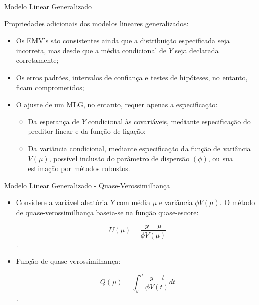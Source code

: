 \documentclass[10pt, aspectratio=169]{beamer}
\begin{document}
\begin{frame}{Modelo Linear Generalizado} 

Propriedades adicionais dos modelos lineares generalizados:

\begin{itemize}

\item Os EMV's são consistentes ainda que a distribuição especificada seja incorreta, mas desde que a média condicional de $Y$ seja declarada corretamente;

\item Os erros padrões, intervalos de confiança e testes de hipóteses, no entanto, ficam comprometidos;

\item O ajuste de um MLG, no entanto, requer apenas a especificação:

\begin{itemize}
\item Da esperança de $Y$ condicional às covariáveis, mediante especificação do preditor linear e da função de ligação;

\item Da variância condicional, mediante especificação da função de variância $V(\mu)$, possível inclusão do parâmetro de dispersão $(\phi)$, ou sua estimação por métodos robustos.

\end{itemize}

\end{itemize}

\end{frame}









\begin{frame}{Modelo Linear Generalizado - Quase-Verossimilhança} 

\begin{itemize}

\item Considere a variável aleatória $Y$ com média $\mu$ e variância $\phi V(\mu)$. O método de quase-verossimilhança baseia-se na função quase-escore:

$$ U(\mu) = \frac{y-\mu}{\phi V(\mu)}$$.

\item Função de quase-verossimilhança:

$$ Q\left ( \mu \right )=\int _y^\mu \frac{y-t}{\phi V(t)}dt $$.

\end{itemize}

\end{frame}
\end{document}
